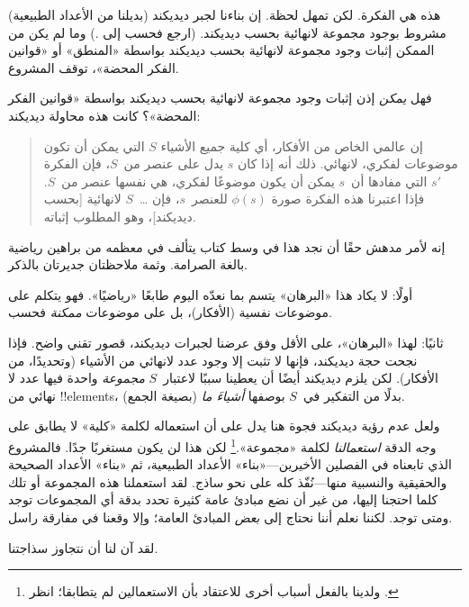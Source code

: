 \documentclass[../../../include/open-logic-section]{subfiles}
\begin{document}
هذه هي الفكرة. لكن تمهل لحظة. إن بناءنا لجبر ديديكند (بديلنا من
الأعداد الطبيعية) مشروط بوجود مجموعة لانهائية بحسب ديديكند. (ارجع
فحسب إلى .)
وما لم يكن من الممكن إثبات وجود مجموعة لانهائية بحسب ديديكند بواسطة
«المنطق» أو «قوانين الفكر المحضة»، توقف المشروع.

فهل \emph{يمكن} إذن إثبات وجود مجموعة لانهائية بحسب ديديكند بواسطة
«قوانين الفكر المحضة»؟ كانت هذه محاولة ديديكند:
\begin{quote}
  إن عالمي الخاص من الأفكار، أي كلية جميع الأشياء $S$ التي يمكن أن
  تكون موضوعات لفكري، لانهائي. ذلك أنه إذا كان $s$ يدل على عنصر
  من~$S$، فإن الفكرة $s'$ التي مفادها أن~$s$ يمكن أن يكون موضوعًا
  لفكري، هي نفسها عنصر من~$S$. فإذا اعتبرنا هذه الفكرة صورة
  $\phi(s)$ للعنصر~$s$، فإن \dots~$S$ لانهائية [بحسب ديديكند]، وهو
  المطلوب إثباته.
	\citep[\S66]{Dedekind1888}
\end{quote}
إنه لأمر مدهش حقًا أن نجد هذا في وسط كتاب يتألف في معظمه من براهين
رياضية بالغة الصرامة. وثمة ملاحظتان جديرتان بالذكر.

أولًا: لا يكاد هذا «البرهان» يتسم بما نعدّه اليوم طابعًا «رياضيًا».
فهو يتكلم على موضوعات نفسية (الأفكار)، بل على موضوعات \emph{ممكنة}
فحسب.

ثانيًا: لهذا «البرهان»، على الأقل وفق عرضنا لجبرات ديديكند، قصور تقني
واضح. فإذا نجحت حجة ديديكند، فإنها لا تثبت إلا وجود عدد لانهائي من
الأشياء (وتحديدًا، من الأفكار). لكن يلزم ديديكند أيضًا أن
يعطينا سببًا لاعتبار~$S$ \emph{مجموعة} واحدة فيها عدد لا نهائي من
!!{element}s، بدلًا من التفكير في~$S$ بوصفها \emph{أشياءَ ما} (بصيغة
الجمع).

ولعل عدم رؤية ديديكند فجوة هنا يدل على أن استعماله لكلمة «كلية» لا
يطابق على وجه الدقة \emph{استعمالنا} لكلمة «مجموعة».\footnote{ولدينا
بالفعل أسباب أخرى للاعتقاد بأن الاستعمالين لم يتطابقا؛ انظر
\citet[ص~23]{Potter2004}.} لكن هذا لن يكون مستغربًا جدًا. فالمشروع الذي
تابعناه في الفصلين الأخيرين---«بناء» الأعداد الطبيعية، ثم «بناء»
الأعداد الصحيحة والحقيقية والنسبية منها---نُفّذ كله على نحو ساذج. لقد
استعملنا هذه المجموعة أو تلك كلما احتجنا إليها، من غير أن نضع مبادئ
عامة كثيرة تحدد بدقة أي المجموعات توجد ومتى توجد. لكننا نعلم أننا
نحتاج إلى \emph{بعض} المبادئ العامة؛ وإلا وقعنا في مفارقة راسل.

لقد آن لنا أن نتجاوز سذاجتنا.
\end{document}
